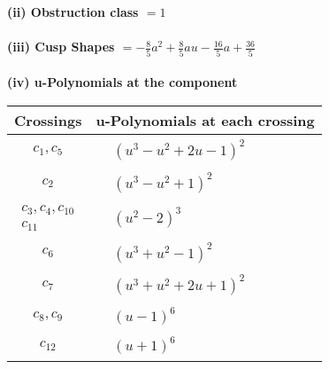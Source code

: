 \documentclass[1p]{elsarticle_modified}
\theoremstyle{definition}
\begin{document}
\flushleft \textbf{(ii) Obstruction class $= 1$}\\~\\
\flushleft \textbf{(iii) Cusp Shapes $= -\frac{8}{5} a^2+\frac{8}{5} a u-\frac{16}{5} a+\frac{36}{5}$}\\~\\
\newpage\renewcommand{\arraystretch}{1}
\flushleft \textbf{(iv) u-Polynomials at the component}\newline \\
\begin{tabular}{m{50pt}|m{274pt}}
Crossings & \hspace{64pt}u-Polynomials at each crossing \\
\hline $$\begin{aligned}c_{1},c_{5}\end{aligned}$$&$\begin{aligned}
&(u^3- u^2+2 u-1)^2
\end{aligned}$\\
\hline $$\begin{aligned}c_{2}\end{aligned}$$&$\begin{aligned}
&(u^3- u^2+1)^2
\end{aligned}$\\
\hline $$\begin{aligned}c_{3},c_{4},c_{10}\\c_{11}\end{aligned}$$&$\begin{aligned}
&(u^2-2)^3
\end{aligned}$\\
\hline $$\begin{aligned}c_{6}\end{aligned}$$&$\begin{aligned}
&(u^3+u^2-1)^2
\end{aligned}$\\
\hline $$\begin{aligned}c_{7}\end{aligned}$$&$\begin{aligned}
&(u^3+u^2+2 u+1)^2
\end{aligned}$\\
\hline $$\begin{aligned}c_{8},c_{9}\end{aligned}$$&$\begin{aligned}
&(u-1)^6
\end{aligned}$\\
\hline $$\begin{aligned}c_{12}\end{aligned}$$&$\begin{aligned}
&(u+1)^6
\end{aligned}$\\
\hline
\end{tabular}\\~\\
\end{document}
